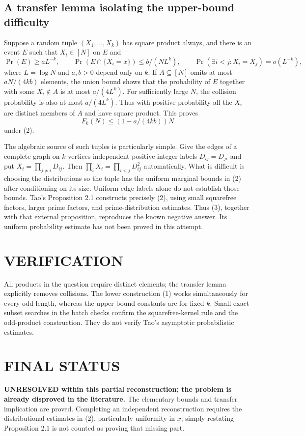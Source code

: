 \subsection*{A transfer lemma isolating the upper-bound difficulty}
Suppose a random tuple $(X_1,\ldots,X_k)$ has square product always,
and there is an event $E$ such that $X_i\in[N]$ on $E$ and
\[
 \Pr(E)\ge aL^{-k},\qquad
 \Pr(E\cap\{X_i=x\})\le b/(NL^k),\qquad
 \Pr(\exists i<j:X_i=X_j)=o(L^{-k}),                       \tag{2}
\]
where $L=\log N$ and $a,b>0$ depend only on $k$.
If $A\subseteq[N]$ omits at most $aN/(4kb)$ elements, the union bound
shows that the probability of $E$ together with some $X_i\notin A$
is at most $a/(4L^k)$. For sufficiently large $N$, the collision
probability is also at most $a/(4L^k)$. Thus with positive probability
all the $X_i$ are distinct members of $A$ and have square product.
This proves
\[
 F_k(N)\le (1-a/(4kb))N                                  \tag{3}
\]
under (2).

The algebraic source of such tuples is particularly simple. Give the
edges of a complete graph on $k$ vertices independent positive integer
labels $D_{ij}=D_{ji}$ and put $X_i=\prod_{j\ne i}D_{ij}$.
Then $\prod_iX_i=\prod_{i<j}D_{ij}^2$ automatically. What is difficult
is choosing the distributions so the tuple has the uniform marginal
bounds in (2) after conditioning on its size. Uniform edge labels
alone do not establish those bounds.
Tao's Proposition 2.1 constructs precisely (2), using small squarefree
factors, larger prime factors, and prime-distribution estimates. Thus
(3), together with that external proposition, reproduces the known
negative answer. Its uniform probability estimate has not been proved
in this attempt.

\section{VERIFICATION}
All products in the question require distinct elements; the transfer
lemma explicitly removes collisions. The lower construction (1) works
simultaneously for every odd length, whereas the upper-bound constants
are for fixed $k$. Small exact subset searches in the batch checks
confirm the squarefree-kernel rule and the odd-product construction.
They do not verify Tao's asymptotic probabilistic estimates.

\section{FINAL STATUS}
\textbf{UNRESOLVED within this partial reconstruction; the problem is
already disproved in the literature.}
The elementary bounds and transfer implication are proved. Completing
an independent reconstruction requires the distributional estimates
in (2), particularly uniformity in $x$; simply restating Proposition 2.1
is not counted as proving that missing part.


